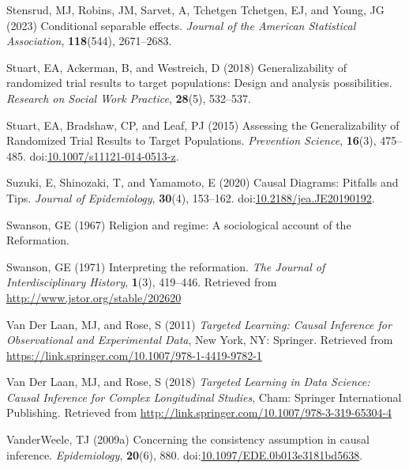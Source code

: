 \documentclass[
  single column]{article}
\newlength{\cslhangindent}
\newenvironment{CSLReferences}[2] %
 {\begin{list}{}{%
  \setlength{\itemindent}{0pt}
  \setlength{\leftmargin}{0pt}
  \setlength{\parsep}{0pt}
  \ifodd #1
   \setlength{\leftmargin}{\cslhangindent}
   \setlength{\itemindent}{-1\cslhangindent}
  \fi
  \setlength{\itemsep}{#2\baselineskip}}}
 {\end{list}}
\begin{document}
\begin{CSLReferences}{1}{0}
Stensrud, MJ, Robins, JM, Sarvet, A, Tchetgen Tchetgen, EJ, and Young,
JG (2023) Conditional separable effects. \emph{Journal of the American
Statistical Association}, \textbf{118}(544), 2671--2683.

Stuart, EA, Ackerman, B, and Westreich, D (2018) Generalizability of
randomized trial results to target populations: Design and analysis
possibilities. \emph{Research on Social Work Practice}, \textbf{28}(5),
532--537.

Stuart, EA, Bradshaw, CP, and Leaf, PJ (2015) Assessing the
Generalizability of Randomized Trial Results to Target Populations.
\emph{Prevention Science}, \textbf{16}(3), 475--485.
doi:\href{https://doi.org/10.1007/s11121-014-0513-z}{10.1007/s11121-014-0513-z}.

Suzuki, E, Shinozaki, T, and Yamamoto, E (2020) Causal Diagrams:
Pitfalls and Tips. \emph{Journal of Epidemiology}, \textbf{30}(4),
153--162.
doi:\href{https://doi.org/10.2188/jea.JE20190192}{10.2188/jea.JE20190192}.

Swanson, GE (1967) Religion and regime: A sociological account of the
{R}eformation.

Swanson, GE (1971) Interpreting the reformation. \emph{The Journal of
Interdisciplinary History}, \textbf{1}(3), 419--446. Retrieved from
\url{http://www.jstor.org/stable/202620}

Van Der Laan, MJ, and Rose, S (2011) \emph{Targeted Learning: Causal
Inference for Observational and Experimental Data}, New York, NY:
Springer. Retrieved from
\url{https://link.springer.com/10.1007/978-1-4419-9782-1}

Van Der Laan, MJ, and Rose, S (2018) \emph{Targeted Learning in Data
Science: Causal Inference for Complex Longitudinal Studies}, Cham:
Springer International Publishing. Retrieved from
\url{http://link.springer.com/10.1007/978-3-319-65304-4}

VanderWeele, TJ (2009a) Concerning the consistency assumption in causal
inference. \emph{Epidemiology}, \textbf{20}(6), 880.
doi:\href{https://doi.org/10.1097/EDE.0b013e3181bd5638}{10.1097/EDE.0b013e3181bd5638}.


\end{CSLReferences}
\end{document}
